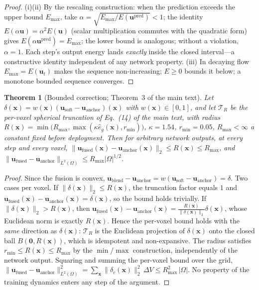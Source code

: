 \documentclass[11pt,a4paper]{article}
\newtheorem{theorem}{Theorem}
\newcommand{\bu}{\bm{u}}
\newcommand{\cT}{\mathcal{T}}
\newcommand{\Ex}{E}
\begin{document}
\begin{proof}
(i)(ii) By the rescaling construction: when the prediction exceeds the upper bound $\Ex_{\max}$, take $\alpha=\sqrt{\Ex_{\max}/\Ex(\bu^{\mathrm{pred}})}<1$; the identity $\Ex(\alpha\bu)=\alpha^2\Ex(\bu)$ (scalar multiplication commutes with the quadratic form) gives $\Ex(\alpha\bu^{\mathrm{pred}})=\Ex_{\max}$; the lower bound is analogous; without a violation, $\alpha=1$. Each step's output energy lands \emph{exactly} inside the closed interval---a constructive identity independent of any network property. (iii) In decaying flow $\Ex_{\max}=\Ex(\bu_t)$ makes the sequence non-increasing; $\Ex\ge0$ bounds it below; a monotone bounded sequence converges.
\end{proof}

\begin{theorem}[Bounded correction; Theorem~3 of the main text]
Let $\delta(\bm{x})=w(\bm{x})(\bu_{\mathrm{soft}}-\bu_{\mathrm{anchor}})(\bm{x})$ with $w(\bm{x})\in[0,1]$, and let $\cT_R$ be the per-voxel spherical truncation of Eq.~(14) of the main text, with radius $R(\bm{x})=\min\!\big(R_{\max},\max(\kappa\hat e_g(\bm{x}),r_{\min})\big)$, $\kappa=1.54$, $r_{\min}=0.05$, $R_{\max}<\infty$ a constant fixed before deployment. Then for arbitrary network outputs, at every step and every voxel,
$\|\bu_{\mathrm{fused}}(\bm{x})-\bu_{\mathrm{anchor}}(\bm{x})\|_2\le R(\bm{x})\le R_{\max}$, and
$\|\bu_{\mathrm{fused}}-\bu_{\mathrm{anchor}}\|_{L^2(\Omega)}\le R_{\max}|\Omega|^{1/2}$.
\end{theorem}

\begin{proof}
Since the fusion is convex, $\bu_{\mathrm{blend}}-\bu_{\mathrm{anchor}}=w(\bu_{\mathrm{soft}}-\bu_{\mathrm{anchor}})=\delta$. Two cases per voxel. If $\|\delta(\bm{x})\|_2\le R(\bm{x})$, the truncation factor equals $1$ and $\bu_{\mathrm{fused}}(\bm{x})-\bu_{\mathrm{anchor}}(\bm{x})=\delta(\bm{x})$, so the bound holds trivially. If $\|\delta(\bm{x})\|_2>R(\bm{x})$, then
$\bu_{\mathrm{fused}}(\bm{x})-\bu_{\mathrm{anchor}}(\bm{x})=\frac{R(\bm{x})}{\|\delta(\bm{x})\|_2}\delta(\bm{x})$,
whose Euclidean norm is exactly $R(\bm{x})$. Hence the per-voxel bound holds with the \emph{same} direction as $\delta(\bm{x})$: $\cT_R$ is the Euclidean projection of $\delta(\bm{x})$ onto the closed ball $B(\bm 0,R(\bm{x}))$, which is idempotent and non-expansive. The radius satisfies $r_{\min}\le R(\bm{x})\le R_{\max}$ by the $\min/\max$ construction, independently of the network output. Squaring and summing the per-voxel bound over the grid,
$\|\bu_{\mathrm{fused}}-\bu_{\mathrm{anchor}}\|_{L^2(\Omega)}^2=\sum_{\bm{x}}\|\delta_c(\bm{x})\|_2^2\,\Delta V\le R_{\max}^2\,|\Omega|$.
No property of the training dynamics enters any step of the argument.
\end{proof}
\end{document}
